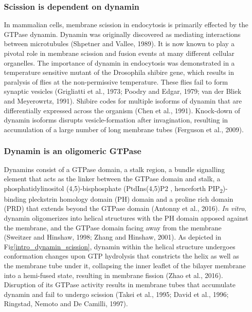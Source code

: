 		\subsubsection{Scission is dependent on dynamin} 
In mammalian cells, membrane scission in endocytosis is primarily effected by the GTPase dynamin. Dynamin was originally discovered as mediating interactions between microtubules (Shpetner and Vallee, 1989). It is now known to play a pivotal role in membrane scission and fusion events at many different cellular organelles. The importance of dynamin in endocytosis was demonstrated in a temperature sensitive mutant of the Drosophila shibire gene, which results in paralysis of flies at the non-permissive temperature. These flies fail to form synaptic vesicles (Grigliatti et al., 1973; Poodry and Edgar, 1979; van der Bliek and Meyerowrtz, 1991). Shibire codes for multiple isoforms of dynamin that are differentially expressed across the organism (Chen et al., 1991). Knock-down of dynamin isoforms disrupts vesicle-formation after invagination, resulting in accumulation of a large number of long membrane tubes (Ferguson et al., 2009). 

		\subsubsection{Dynamin is an oligomeric GTPase}
Dynamins consist of a GTPase domain, a stalk region, a bundle signalling element that acts as the linker between the GTPase domain and stalk, a phosphatidylinositol (4,5)-bisphosphate (PtdIns(4,5)P2 , henceforth 	PIP\textsubscript{2})-binding pleckstrin homology domain (PH) domain and a proline rich domain (PRD) that extends beyond the GTPase domain (Antonny et al., 2016). \textit{In vitro}, dynamin oligomerizes into helical structures with the PH domain apposed against the membrane, and the GTPase domain facing away from the membrane (Sweitzer and Hinshaw, 1998; Zhang and Hinshaw, 2001). As depicted in Fig\ref{intro_dynamin_scission}, dynamin within the helical structure undergoes conformation changes upon GTP hydrolysis that constricts the helix as well as the membrane tube under it, collapsing the inner leaflet of the bilayer membrane into a hemi-fused state, resulting in membrane fission (Zhao et al., 2016). Disruption of its GTPase activity results in membrane tubes that accumulate dynamin and fail to undergo scission (Takei et al., 1995; David et al., 1996; Ringstad, Nemoto and De Camilli, 1997).


